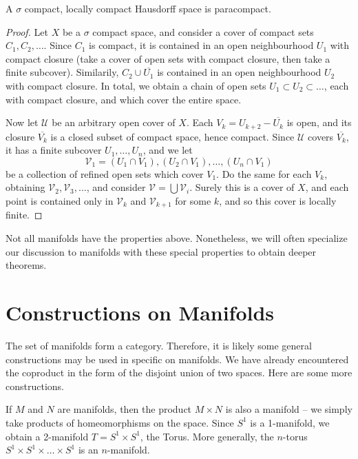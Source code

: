 \begin{lemma}[$1) \to (4$]
    A $\sigma$ compact, locally compact Hausdorff space is paracompact.
\end{lemma}
\begin{proof}
    Let $X$ be a $\sigma$ compact space, and consider a cover of compact sets $C_1, C_2, \dots$. Since $C_1$ is compact, it is contained in an open neighbourhood $U_1$ with compact closure (take a cover of open sets with compact closure, then take a finite subcover). Similarily, $C_2 \cup \overline{U_1}$ is contained in an open neighbourhood $U_2$ with compact closure. In total, we obtain a chain of open sets $U_1 \subset U_2 \subset \dots$, each with compact closure, and which cover the entire space.

    Now let $\mathcal{U}$ be an arbitrary open cover of $X$. Each $V_k = U_{k+2} - \overline{U_k}$ is open, and its closure $\overline{V_k}$ is a closed subset of compact space, hence compact. Since $\mathcal{U}$ covers $\overline{V_k}$, it has a finite subcover $U_1, \dots, U_n$, and we let
    \[ \mathcal{V}_1 = (U_1 \cap V_1), (U_2 \cap V_1), \dots, (U_n \cap V_1) \]
    be a collection of refined open sets which cover $V_1$. Do the same for each $V_k$, obtaining $\mathcal{V}_2, \mathcal{V}_3, \dots$, and consider $\mathcal{V} = \bigcup \mathcal{V}_i$. Surely this is a cover of $X$, and each point is contained only in $\mathcal{V}_k$ and $\mathcal{V}_{k+1}$ for some $k$, and so this cover is locally finite.
\end{proof}

Not all manifolds have the properties above. Nonetheless, we will often specialize our discussion to manifolds with these special properties to obtain deeper theorems.

\section{Constructions on Manifolds}

The set of manifolds form a category. Therefore, it is likely some general constructions may be used in specific on manifolds. We have already encountered the coproduct in the form of the disjoint union of two spaces. Here are some more constructions.

\begin{example}
    If $M$ and $N$ are manifolds, then the product $M \times N$ is also a manifold -- we simply take products of homeomorphisms on the space. Since $S^1$ is a 1-manifold, we obtain a 2-manifold $T = S^1 \times S^1$, the Torus. More generally, the $n$-torus $S^1 \times S^1 \times \dots \times S^1$ is an $n$-manifold.
\end{example}

